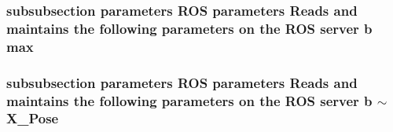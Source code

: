 \subsubsection[{\texorpdfstring{max}{max}}]{\setlength{\rightskip}{0pt plus 5cm}subsubsection parameters R\+OS parameters Reads and maintains the following parameters on the R\+OS server b max}\hypertarget{_jaco_position_config_8dox_a55c9de72d9f3630abdf51bfe39c191dd}{}\label{_jaco_position_config_8dox_a55c9de72d9f3630abdf51bfe39c191dd}
\subsubsection[{\texorpdfstring{$\sim$\+X\+\_\+\+Pose}{~X_Pose}}]{\setlength{\rightskip}{0pt plus 5cm}subsubsection parameters R\+OS parameters Reads and maintains the following parameters on the R\+OS server b $\sim$X\+\_\+\+Pose}\hypertarget{_jaco_position_config_8dox_a9fff660751927d01485c1718209052c8}{}\label{_jaco_position_config_8dox_a9fff660751927d01485c1718209052c8}
